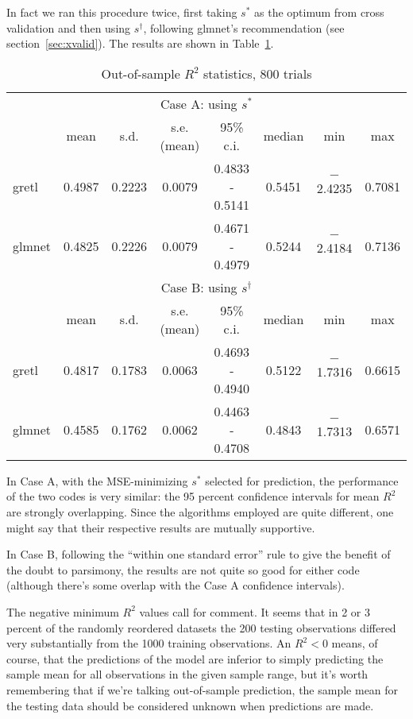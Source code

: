 \documentclass{article}
\begin{document}
In fact we ran this procedure twice, first taking $s^*$ as the optimum
from cross validation and then using $s^{\dagger}$, following
\textsf{glmnet}'s recommendation (see section~\ref{sec:xvalid}). The
results are shown in Table~\ref{tab:bigtest}.

\begin{table}[htbp]
  \centering
  \begin{tabular}{lccccccc}
    \multicolumn{8}{c}{Case A: using $s^*$} \\
 & mean & s.d. & s.e.(mean) & 95\% c.i. & median & min & max \\
\textsf{gretl} & 0.4987 & 0.2223 & 0.0079 & 0.4833 - 0.5141 & 0.5451 & $-$2.4235 & 0.7081 \\
\textsf{glmnet} & 0.4825 & 0.2226 & 0.0079 & 0.4671 - 0.4979 & 0.5244 & $-$2.4184 & 0.7136 \\[8pt]
    \multicolumn{8}{c}{Case B: using $s^{\dagger}$} \\
 & mean & s.d. & s.e.(mean) & 95\% c.i. & median & min & max \\
\textsf{gretl} & 0.4817 & 0.1783 & 0.0063 & 0.4693 - 0.4940 & 0.5122 & $-$1.7316 & 0.6615 \\
\textsf{glmnet} & 0.4585 & 0.1762 & 0.0062 & 0.4463 - 0.4708 & 0.4843 & $-$1.7313 & 0.6571 \\
  \end{tabular}
  \caption{Out-of-sample $R^2$ statistics, 800 trials}
  \label{tab:bigtest}
\end{table}

In Case A, with the MSE-minimizing $s^*$ selected for prediction, the
performance of the two codes is very similar: the 95 percent
confidence intervals for mean $R^2$ are strongly overlapping.  Since
the algorithms employed are quite different, one might say that their
respective results are mutually supportive.

In Case B, following the ``within one standard error'' rule to give
the benefit of the doubt to parsimony, the results are not quite so
good for either code (although there's some overlap with the Case A
confidence intervals).

The negative minimum $R^2$ values call for comment. It seems that
in 2 or 3 percent of the randomly reordered datasets the 200
testing observations differed very substantially from the 1000
training observations. An $R^2 < 0$ means, of course, that the
predictions of the model are inferior to simply predicting the sample
mean for all observations in the given sample range, but it's worth
remembering that if we're talking out-of-sample prediction, the
sample mean for the testing data should be considered unknown when
predictions are made.
\end{document}
